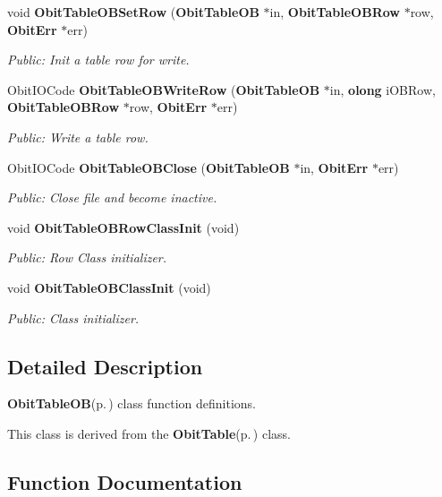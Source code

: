 \begin{CompactItemize}
void {\bf Obit\-Table\-OBSet\-Row} ({\bf Obit\-Table\-OB} $\ast$in, {\bf Obit\-Table\-OBRow} $\ast$row, {\bf Obit\-Err} $\ast$err)
\begin{CompactList}\small\item\em Public: Init a table row for write. \item\end{CompactList}\item 
Obit\-IOCode {\bf Obit\-Table\-OBWrite\-Row} ({\bf Obit\-Table\-OB} $\ast$in, {\bf olong} i\-OBRow, {\bf Obit\-Table\-OBRow} $\ast$row, {\bf Obit\-Err} $\ast$err)
\begin{CompactList}\small\item\em Public: Write a table row. \item\end{CompactList}\item 
Obit\-IOCode {\bf Obit\-Table\-OBClose} ({\bf Obit\-Table\-OB} $\ast$in, {\bf Obit\-Err} $\ast$err)
\begin{CompactList}\small\item\em Public: Close file and become inactive. \item\end{CompactList}\item 
void {\bf Obit\-Table\-OBRow\-Class\-Init} (void)
\begin{CompactList}\small\item\em Public: Row Class initializer. \item\end{CompactList}\item 
void {\bf Obit\-Table\-OBClass\-Init} (void)
\begin{CompactList}\small\item\em Public: Class initializer. \item\end{CompactList}\end{CompactItemize}


\subsection{Detailed Description}
{\bf Obit\-Table\-OB}{\rm (p.\,\pageref{structObitTableOB})} class function definitions. 

This class is derived from the {\bf Obit\-Table}{\rm (p.\,\pageref{structObitTable})} class.

\subsection{Function Documentation}
